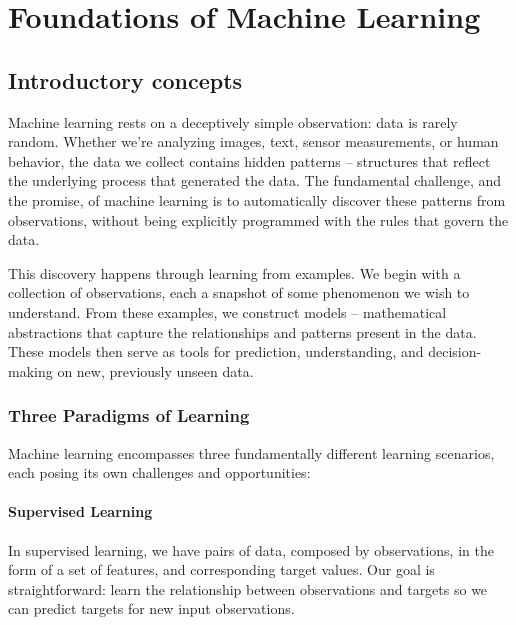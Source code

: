 %
%
%
%
%

\chapter{Foundations of Machine Learning}

\section*{Introductory concepts}
Machine learning rests on a deceptively simple observation: data is rarely random. Whether we're analyzing images, text, sensor measurements, or human behavior, the data we collect contains hidden patterns -- structures that reflect the underlying process that generated the data. The fundamental challenge, and the promise, of machine learning is to automatically discover these patterns from observations, without being explicitly programmed with the rules that govern the data.

This discovery happens through learning from examples. We begin with a collection of observations, each a snapshot of some phenomenon we wish to understand. From these examples, we construct \alert{models} -- mathematical abstractions that capture the relationships and patterns present in the data. These models then serve as tools for prediction, understanding, and decision-making on new, previously unseen data.


\subsection*{Three Paradigms of Learning}

Machine learning encompasses three fundamentally different learning scenarios, each posing its own challenges and opportunities:

\subsubsection*{Supervised Learning}

In supervised learning, we have pairs of data, composed by observations, in the form of a set of features, and corresponding target values. Our goal is straightforward: learn the relationship between observations and targets so we can predict targets for new input observations.


